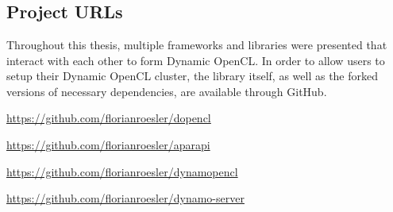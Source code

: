 \chapter{\appendixname}

\section*{Project URLs}
\label{appendix:links}
Throughout this thesis, multiple frameworks and libraries were presented that interact with each other to form Dynamic OpenCL. In order to allow users to setup their Dynamic OpenCL cluster, the library itself, as well as the forked versions of necessary dependencies, are available through GitHub.

\begin{description}[align=left]
	\item [dOpenCL] \url{https://github.com/florianroesler/dopencl}
	\item [Aparapi] \url{https://github.com/florianroesler/aparapi}
	\item [Dynamic OpenCL] \url{https://github.com/florianroesler/dynamopencl}
	\item [Dynamic OpenCL Web Server Demo] \url{https://github.com/florianroesler/dynamo-server}
\end{description}

